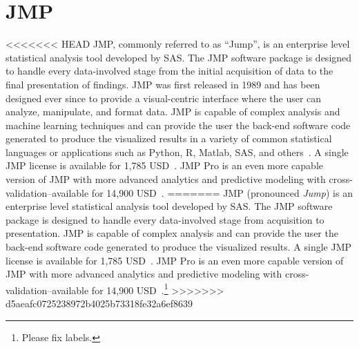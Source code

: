 \section{JMP}

<<<<<<< HEAD
JMP, commonly referred to as ``Jump'', is an enterprise level
statistical analysis tool developed by SAS. The JMP software package
is designed to handle every data-involved stage from the initial
acquisition of data to the final presentation of findings. JMP was
first released in 1989 and has been designed ever since to provide a
visual-centric interface where the user can analyze, manipulate, and
format data. JMP is capable of complex analysis and machine learning
techniques and can provide the user the back-end software code
generated to produce the visualized results in a variety of common
statistical languages or applications such as Python, R, Matlab, SAS,
and others~\cite{hid-sp18-507-JMP9}. A single JMP license is available
for 1,785 USD~\cite{hid-sp18-507-JMPSAS}. JMP Pro is an even more
capable version of JMP with more advanced analytics and predictive
modeling with cross-validation--available for 14,900
USD~\cite{hid-sp18-507-JMPPro}.
=======
JMP (pronounced \textit{Jump}) is an enterprise level statistical
analysis tool developed by SAS. The JMP software package is designed
to handle every data-involved stage from acquisition to
presentation. JMP is capable of complex analysis and can provide the
user the back-end software code generated to produce the visualized
results. A single JMP license is available for 1,785
USD~\cite{JMPSAS}. JMP Pro is an even more capable version of JMP with
more advanced analytics and predictive modeling with
cross-validation--available for 14,900 USD~\cite{JMPPro}.\footnote{Please fix labels.}
>>>>>>> d5aeafc0725238972b4025b73318fe32a6ef8639
